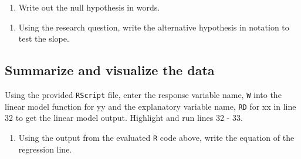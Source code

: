 \documentclass[
]{report}
\newenvironment{Shaded}{\begin{snugshade}}{\end{snugshade}}
\newcommand{\CommentTok}[1]{\textcolor[rgb]{0.56,0.35,0.01}{\textit{#1}}}
\newcommand{\DataTypeTok}[1]{\textcolor[rgb]{0.13,0.29,0.53}{#1}}
\newcommand{\DecValTok}[1]{\textcolor[rgb]{0.00,0.00,0.81}{#1}}
\newcommand{\KeywordTok}[1]{\textcolor[rgb]{0.13,0.29,0.53}{\textbf{#1}}}
\newcommand{\NormalTok}[1]{#1}
\newcommand{\OperatorTok}[1]{\textcolor[rgb]{0.81,0.36,0.00}{\textbf{#1}}}
\newcommand{\StringTok}[1]{\textcolor[rgb]{0.31,0.60,0.02}{#1}}
\providecommand{\tightlist}{%
  \setlength{\itemsep}{0pt}\setlength{\parskip}{0pt}}
\begin{document}
\begin{enumerate}
\def\labelenumi{\arabic{enumi}.}
\setcounter{enumi}{5}
\tightlist
\item
  Write out the null hypothesis in words.
\end{enumerate}

\vspace{1in}

\begin{enumerate}
\def\labelenumi{\arabic{enumi}.}
\setcounter{enumi}{6}
\tightlist
\item
  Using the research question, write the alternative hypothesis in notation to test the slope.
\end{enumerate}

\vspace{0.5in}

\hypertarget{summarize-and-visualize-the-data}{%
\subsection*{Summarize and visualize the data}\label{summarize-and-visualize-the-data}}

Using the provided \texttt{RScript} file, enter the response variable name, \texttt{W} into the linear model function for yy and the explanatory variable name, \texttt{RD} for xx in line 32 to get the linear model output. Highlight and run lines 32 - 33.

\begin{Shaded}
\end{Shaded}

\begin{enumerate}
\def\labelenumi{\arabic{enumi}.}
\setcounter{enumi}{7}
\tightlist
\item
  Using the output from the evaluated \texttt{R} code above, write the equation of the regression line.
\end{enumerate}

\vspace{1in}
\end{document}
